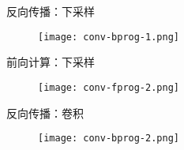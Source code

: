 \begin{frame}[fragile]{反向传播：下采样}
  \begin{figure}
    \centering
    \texttt{[image: conv-bprog-1.png]}
  \end{figure}
\end{frame}

\begin{frame}[fragile]{前向计算：下采样}
  \begin{figure}
    \centering
    \texttt{[image: conv-fprog-2.png]}
  \end{figure}
\end{frame}

\begin{frame}[fragile]{反向传播：卷积}
  \begin{figure}
    \centering
    \texttt{[image: conv-bprog-2.png]}
  \end{figure}
\end{frame}
